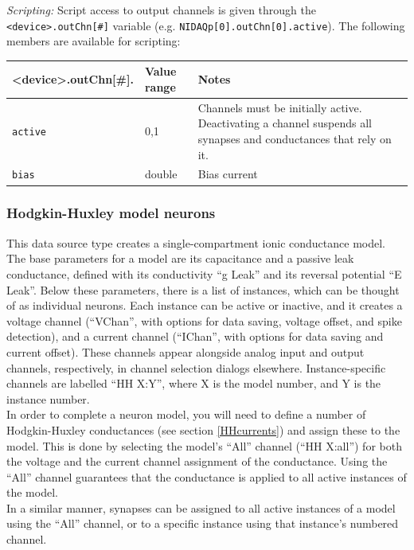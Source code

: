 \documentclass{article}
\begin{document}
\noindent
\emph{Scripting:} Script access to output channels is given through the \texttt{<device>.outChn[\#]} variable
(e.g. \texttt{NIDAQp[0].outChn[0].active}).
The following members are available for scripting: \\
\begin{tabularx}{\linewidth}{|ll|X|}
	\hline
	{\bf \textless{}device\textgreater.outChn[\#].\textvisiblespace} & {\bf Value range} & {\bf Notes} \\
	\hline
	\texttt{active} & 0,1 & Channels must be initially active. Deactivating a channel suspends all
	synapses and conductances that rely on it. \\
	\texttt{bias} & double & Bias current \\
	\hline
\end{tabularx}


\subsubsection{Hodgkin-Huxley model neurons} \label{HHmodels}

This data source type creates a single-compartment ionic conductance model.
The base parameters for a model are its capacitance and a passive leak conductance,
defined with its conductivity ``g Leak'' and its reversal potential ``E Leak''.
Below these parameters, there is a list of instances, which can be thought of as
individual neurons. Each instance can be active or inactive, and it creates a voltage
channel (``VChan'', with options for data saving, voltage offset, and spike detection),
and a current channel (``IChan'', with options for data saving and current offset).
These channels appear alongside analog input and output channels, respectively, in
channel selection dialogs elsewhere. Instance-specific channels are labelled ``HH X:Y'',
where X is the model number, and Y is the instance number. \\
In order to complete a neuron model, you will need to define a number of Hodgkin-Huxley
conductances (see section \ref{HHcurrents}) and assign these to the model. This is done
by selecting the model's ``All'' channel (``HH X:all'') for both the voltage and the current channel
assignment of the conductance. Using the ``All'' channel guarantees that the conductance
is applied to all active instances of the model. \\
In a similar manner, synapses can be assigned to all active instances of a model
using the ``All'' channel, or to a specific instance using that instance's numbered
channel.\\
\end{document}
